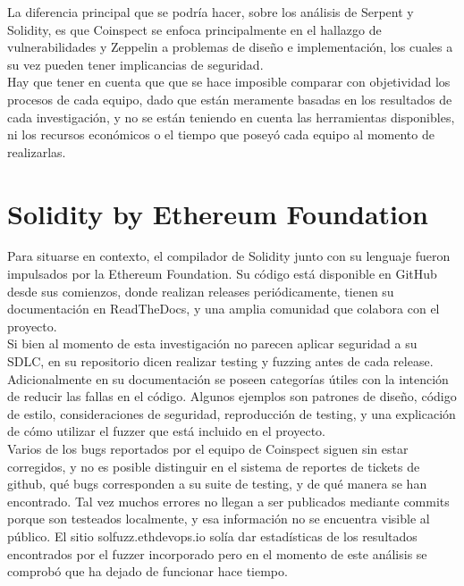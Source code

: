 La diferencia principal que se podría hacer, sobre los análisis de Serpent y Solidity, es que Coinspect se enfoca principalmente en el hallazgo de vulnerabilidades y Zeppelin a problemas de diseño e implementación, los cuales a su vez pueden tener implicancias de seguridad.\\

Hay que tener en cuenta que que se hace imposible comparar con objetividad los procesos de cada equipo, dado que están meramente basadas en los resultados de cada investigación, y no se están teniendo en cuenta las herramientas disponibles, ni los recursos económicos o el tiempo que poseyó cada equipo al momento de realizarlas.\\

\section{Solidity by Ethereum Foundation}

Para situarse en contexto, el compilador de Solidity junto con su lenguaje fueron impulsados por la Ethereum Foundation. Su código está disponible en GitHub\cite{SolidityGitHub} desde sus comienzos, donde realizan releases periódicamente, tienen su documentación en ReadTheDocs\cite{ReadTheDocsSolidity}, y una amplia comunidad que colabora con el proyecto.\\

Si bien al momento de esta investigación no parecen aplicar seguridad a su SDLC, en su repositorio dicen realizar testing y fuzzing antes de cada release. Adicionalmente en su documentación se poseen categorías útiles con la intención de reducir las fallas en el código. Algunos ejemplos son patrones de diseño, código de estilo, consideraciones de seguridad, reproducción de testing, y una explicación de cómo utilizar el fuzzer que está incluido en el proyecto.\\

Varios de los bugs reportados por el equipo de Coinspect siguen sin estar corregidos, y no es posible distinguir en el sistema de reportes de tickets de github, qué bugs corresponden a su suite de testing, y de qué manera se han encontrado. Tal vez muchos errores no llegan a ser publicados mediante commits porque son testeados localmente, y esa información no se encuentra visible al público. El sitio solfuzz.ethdevops.io\cite{SolfuzzSite} solía dar estadísticas de los resultados encontrados por el fuzzer incorporado pero en el momento de este análisis se comprobó que ha dejado de funcionar hace tiempo.\\

